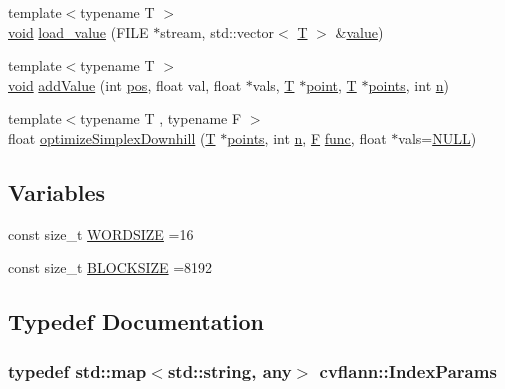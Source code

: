 \begin{DoxyCompactItemize}
\item 
{\footnotesize template$<$typename T $>$ }\\\hyperlink{legacy_8hpp_a8bb47f092d473522721002c86c13b94e}{void} \hyperlink{namespacecvflann_a47ddd76b27249b834fbcd10e20cd0874}{load\-\_\-value} (F\-I\-L\-E $\ast$stream, std\-::vector$<$ \hyperlink{calib3d_8hpp_a3efb9551a871ddd0463079a808916717}{T} $>$ \&\hyperlink{highgui__c_8h_ad4670c92695d4327c21292905a803901}{value})
\item 
{\footnotesize template$<$typename T $>$ }\\\hyperlink{legacy_8hpp_a8bb47f092d473522721002c86c13b94e}{void} \hyperlink{namespacecvflann_a9281aba6b888acb059ca0648372b59a6}{add\-Value} (int \hyperlink{highgui__c_8h_a2eaacae6060d194f31eafce8ca3c09dd}{pos}, float val, float $\ast$vals, \hyperlink{calib3d_8hpp_a3efb9551a871ddd0463079a808916717}{T} $\ast$\hyperlink{legacy_8hpp_a5c1566552733b40c41abae3210910ccb}{point}, \hyperlink{calib3d_8hpp_a3efb9551a871ddd0463079a808916717}{T} $\ast$\hyperlink{legacy_8hpp_a8c4b676395bf614cc92b782d12f18847}{points}, int \hyperlink{legacy_8hpp_a76f11d9a0a47b94f72c2d0e77fb32240}{n})
\item 
{\footnotesize template$<$typename T , typename F $>$ }\\float \hyperlink{namespacecvflann_a57191110b01f200e478c658f3b7a362d}{optimize\-Simplex\-Downhill} (\hyperlink{calib3d_8hpp_a3efb9551a871ddd0463079a808916717}{T} $\ast$\hyperlink{legacy_8hpp_a8c4b676395bf614cc92b782d12f18847}{points}, int \hyperlink{legacy_8hpp_a76f11d9a0a47b94f72c2d0e77fb32240}{n}, \hyperlink{calib3d_8hpp_acc93c21c0e709826b318c946961af8fc}{F} \hyperlink{core__c_8h_a120677ac732b3c9bfecab149fc978afa}{func}, float $\ast$vals=\hyperlink{Config_8cpp_a070d2ce7b6bb7e5c05602aa8c308d0c4}{N\-U\-L\-L})
\end{DoxyCompactItemize}
\subsection*{Variables}
\begin{DoxyCompactItemize}
\item 
const size\-\_\-t \hyperlink{namespacecvflann_a7140ea8434f5b752d5b2b1b4155aba04}{W\-O\-R\-D\-S\-I\-Z\-E} =16
\item 
const size\-\_\-t \hyperlink{namespacecvflann_af6813d97f5ad15bea15d4c914d406e24}{B\-L\-O\-C\-K\-S\-I\-Z\-E} =8192
\end{DoxyCompactItemize}


\subsection{Typedef Documentation}
\hypertarget{namespacecvflann_a742b4c7076c21012054af74a9ee48289}{
\subsubsection[{Index\-Params}]{\setlength{\rightskip}{0pt plus 5cm}typedef {\bf std\-::map}$<$std\-::string, {\bf any}$>$ {\bf cvflann\-::\-Index\-Params}}}\label{namespacecvflann_a742b4c7076c21012054af74a9ee48289}


